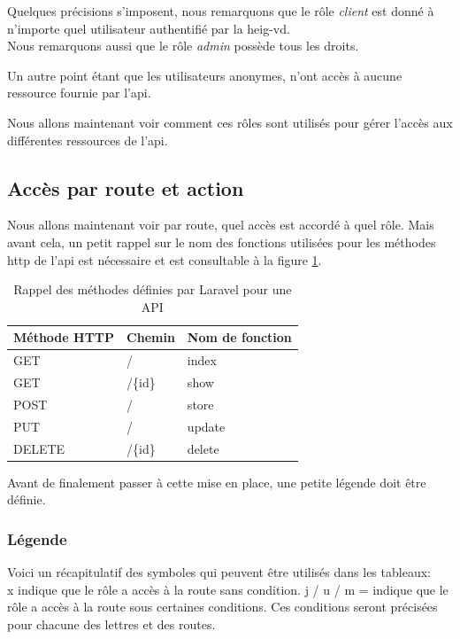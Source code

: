 \documentclass[
    iai, %
    il, %
]{heig-tb}
\begin{document}
Quelques précisions s'imposent, nous remarquons que le rôle \emph{client} est donné à n'importe quel utilisateur authentifié par la \Gls{heig-vd}. \\
Nous remarquons aussi que le rôle \emph{admin} possède tous les droits.

Un autre point étant que les utilisateurs anonymes, n'ont accès à aucune ressource fournie par l'\Gls{api}.

Nous allons maintenant voir comment ces rôles sont utilisés pour gérer l'accès aux différentes ressources de l'\Gls{api}.

\subsection{Accès par route et action}
Nous allons maintenant voir par route, quel accès est accordé à quel rôle.
Mais avant cela, un petit rappel sur le nom des fonctions utilisées pour les méthodes \Gls{http} de l'\Gls{api} est nécessaire et est consultable à la figure \ref{rappel-methode-api}.

\begin{table}[h]
    \begin{center}
        \caption{Rappel des méthodes définies par Laravel pour une API \label{rappel-methode-api}}
        \begin{tabularx}{1.0\textwidth} {X|X|X}
            Méthode HTTP & Chemin  & Nom de fonction \\ \hline
            GET          & /       & index           \\
            GET          & /\{id\} & show            \\
            POST         & /       & store           \\
            PUT          & /       & update          \\
            DELETE       & /\{id\} & delete          \\
        \end{tabularx}
    \end{center}
\end{table}

Avant de finalement passer à cette mise en place, une petite légende doit être définie.

\subsubsection{Légende}
Voici un récapitulatif des symboles qui peuvent être utilisés dans les tableaux: \\
x indique que le rôle a accès à la route sans condition.
j / u / m = indique que le rôle a accès à la route sous certaines conditions. Ces conditions seront précisées pour chacune des lettres et des routes.
\end{document}
